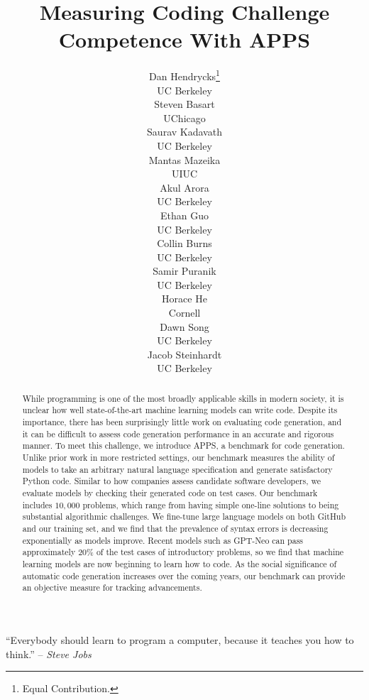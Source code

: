 \documentclass{article}
\title{Measuring Coding Challenge Competence With APPS}
\date{}
\author{Dan Hendrycks\thanks{Equal Contribution.}\\
UC Berkeley\\
\And
Steven Basart\printfnsymbol{1}\\
UChicago\\
\And
Saurav Kadavath\\
UC Berkeley\\
\And
Mantas Mazeika\\
UIUC\\
\And
Akul Arora\\
UC Berkeley\\
\And
Ethan Guo\\
UC Berkeley\\
\And
Collin Burns\\
UC Berkeley\\
\And
Samir Puranik\\
UC Berkeley\\
\And
Horace He\\
Cornell\\
\AND
Dawn Song\\
UC Berkeley\\
\And
Jacob Steinhardt\\
UC Berkeley\\
}
\begin{document}
\maketitle

\begin{abstract}
While programming is one of the most broadly applicable skills in modern society, it is unclear how well state-of-the-art machine learning models can write code. Despite its importance, there has been surprisingly little work on evaluating code generation, and it can be difficult to assess code generation performance in an accurate and rigorous manner. To meet this challenge, we introduce APPS, a benchmark for code generation. Unlike prior work in more restricted settings, our benchmark measures the ability of models to take an arbitrary natural language specification and generate satisfactory Python code. Similar to how companies assess candidate software developers, we evaluate models by checking their generated code on test cases. Our benchmark includes $10,\!000$ problems, which range from having simple one-line solutions to being substantial algorithmic challenges. We fine-tune large language models on both GitHub and our training set, and we find that the prevalence of syntax errors is decreasing exponentially as models improve. Recent models such as GPT-Neo can pass approximately $20\%$ of the test cases of introductory problems, so we find that machine learning models are now beginning to learn how to code. As the social significance of automatic code generation increases over the coming years, our benchmark can provide an objective measure for tracking advancements.
\end{abstract}


``Everybody should learn to program a computer, because it teaches you how to think.'' -- \emph{Steve Jobs}













\end{document}
